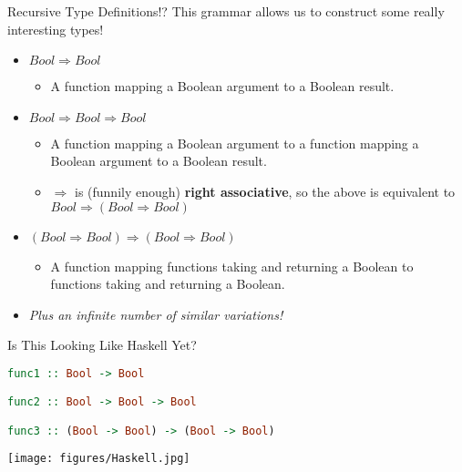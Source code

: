 \documentclass[11pt]{beamer}
\begin{document}
\begin{frame}[fragile=singleslide]{Recursive Type Definitions!?}
This grammar allows us to construct some really interesting types! 
\begin{itemize}
\item $Bool \Rightarrow Bool$
\begin{itemize}
\item A function mapping a Boolean argument to a Boolean result.  
\end{itemize}
\item $Bool \Rightarrow Bool \Rightarrow Bool$
\begin{itemize}
\item A function mapping a Boolean argument to a function mapping a Boolean argument to a Boolean result.  
\item $\Rightarrow$ is (funnily enough) \textbf{right associative}, so the above is equivalent to $Bool \Rightarrow (Bool \Rightarrow Bool)$
\end{itemize}
\item $(Bool \Rightarrow Bool) \Rightarrow (Bool \Rightarrow Bool)$
\begin{itemize}
\item A function mapping functions taking and returning a Boolean to functions taking and returning a Boolean.
\end{itemize}
\item \emph{Plus an infinite number of similar variations!}
\end{itemize}
\end{frame}



\begin{frame}[fragile=singleslide]{Is This Looking Like Haskell Yet?}
\begin{lstlisting}[style=C, language=haskell]
func1 :: Bool -> Bool

func2 :: Bool -> Bool -> Bool

func3 :: (Bool -> Bool) -> (Bool -> Bool)
\end{lstlisting}

\begin{center}
\texttt{[image: figures/Haskell.jpg]}
\end{center}

\end{frame}
\end{document}
